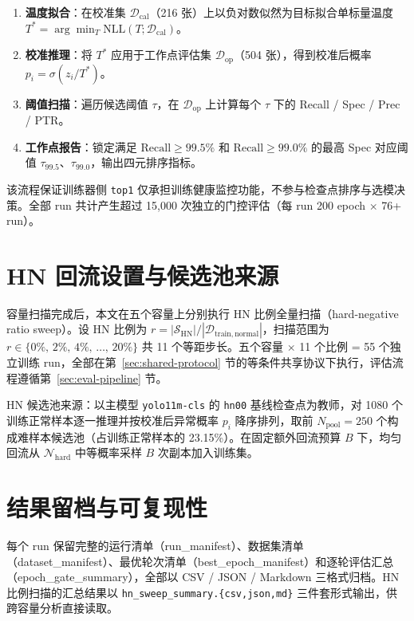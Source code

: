 \documentclass[UTF8,openany,12pt]{ctexbook}
\newcommand{\formalmetric}[1]{\texttt{#1}}
\begin{document}
\begin{enumerate}[leftmargin=2em,nosep]
\item \textbf{温度拟合}：在校准集 $\mathcal{D}_\mathrm{cal}$（216 张）上以负对数似然为目标拟合单标量温度 $T^* = \arg\min_T \mathrm{NLL}(T;\mathcal{D}_\mathrm{cal})$。
\item \textbf{校准推理}：将 $T^*$ 应用于工作点评估集 $\mathcal{D}_\mathrm{op}$（504 张），得到校准后概率 $p_i = \sigma(z_i / T^*)$。
\item \textbf{阈值扫描}：遍历候选阈值 $\tau$，在 $\mathcal{D}_\mathrm{op}$ 上计算每个 $\tau$ 下的 Recall / Spec / Prec / PTR。
\item \textbf{工作点报告}：锁定满足 $\mathrm{Recall} \geq 99.5\%$ 和 $\mathrm{Recall} \geq 99.0\%$ 的最高 Spec 对应阈值 $\tau_{99.5}$、$\tau_{99.0}$，输出四元排序指标。
\end{enumerate}

\noindent 该流程保证训练器侧 \formalmetric{top1} 仅承担训练健康监控功能，不参与检查点排序与选模决策。全部 run 共计产生超过 15{,}000 次独立的门控评估（每 run 200 epoch $\times$ 76+ run）。

\section{HN 回流设置与候选池来源}

容量扫描完成后，本文在五个容量上分别执行 HN 比例全量扫描（hard-negative ratio sweep）。设 HN 比例为 $r = |\mathcal{S}_\mathrm{HN}| / |\mathcal{D}_\mathrm{train,normal}|$，扫描范围为 $r \in \{0\%,\,2\%,\,4\%,\,\ldots,\,20\%\}$ 共 11 个等距步长。五个容量 $\times$ 11 个比例 = 55 个独立训练 run，全部在第~\ref{sec:shared-protocol} 节的等条件共享协议下执行，评估流程遵循第~\ref{sec:eval-pipeline} 节。

HN 候选池来源：以主模型 \texttt{yolo11m-cls} 的 \texttt{hn00} 基线检查点为教师，对 1080 个训练正常样本逐一推理并按校准后异常概率 $p_i$ 降序排列，取前 $N_\mathrm{pool} = 250$ 个构成难样本候选池（占训练正常样本的 23.15\%）。在固定额外回流预算 $B$ 下，均匀回流从 $\mathcal{N}_\mathrm{hard}$ 中等概率采样 $B$ 次副本加入训练集。

\section{结果留档与可复现性}

每个 run 保留完整的运行清单（run\_manifest）、数据集清单（dataset\_manifest）、最优轮次清单（best\_epoch\_manifest）和逐轮评估汇总（epoch\_gate\_summary），全部以 CSV / JSON / Markdown 三格式归档。HN 比例扫描的汇总结果以 \texttt{hn\_sweep\_summary.\{csv,json,md\}} 三件套形式输出，供跨容量分析直接读取。
\end{document}
